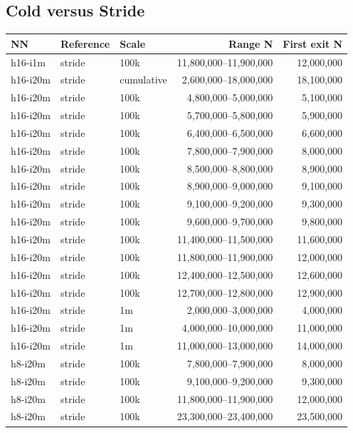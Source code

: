 \documentclass[10pt]{article}
\begin{document}
\subsection{Cold versus Stride}

\scriptsize\begin{longtable}{lllrr}\toprule NN & Reference & Scale & Range N & First exit N \\\midrule\endhead
h16-i1m & stride & 100k & 11,800,000--11,900,000 & 12,000,000 \\
h16-i20m & stride & cumulative & 2,600,000--18,000,000 & 18,100,000 \\
h16-i20m & stride & 100k & 4,800,000--5,000,000 & 5,100,000 \\
h16-i20m & stride & 100k & 5,700,000--5,800,000 & 5,900,000 \\
h16-i20m & stride & 100k & 6,400,000--6,500,000 & 6,600,000 \\
h16-i20m & stride & 100k & 7,800,000--7,900,000 & 8,000,000 \\
h16-i20m & stride & 100k & 8,500,000--8,800,000 & 8,900,000 \\
h16-i20m & stride & 100k & 8,900,000--9,000,000 & 9,100,000 \\
h16-i20m & stride & 100k & 9,100,000--9,200,000 & 9,300,000 \\
h16-i20m & stride & 100k & 9,600,000--9,700,000 & 9,800,000 \\
h16-i20m & stride & 100k & 11,400,000--11,500,000 & 11,600,000 \\
h16-i20m & stride & 100k & 11,800,000--11,900,000 & 12,000,000 \\
h16-i20m & stride & 100k & 12,400,000--12,500,000 & 12,600,000 \\
h16-i20m & stride & 100k & 12,700,000--12,800,000 & 12,900,000 \\
h16-i20m & stride & 1m & 2,000,000--3,000,000 & 4,000,000 \\
h16-i20m & stride & 1m & 4,000,000--10,000,000 & 11,000,000 \\
h16-i20m & stride & 1m & 11,000,000--13,000,000 & 14,000,000 \\
h8-i20m & stride & 100k & 7,800,000--7,900,000 & 8,000,000 \\
h8-i20m & stride & 100k & 9,100,000--9,200,000 & 9,300,000 \\
h8-i20m & stride & 100k & 11,800,000--11,900,000 & 12,000,000 \\
h8-i20m & stride & 100k & 23,300,000--23,400,000 & 23,500,000 \\\bottomrule\end{longtable}\normalsize
\end{document}
